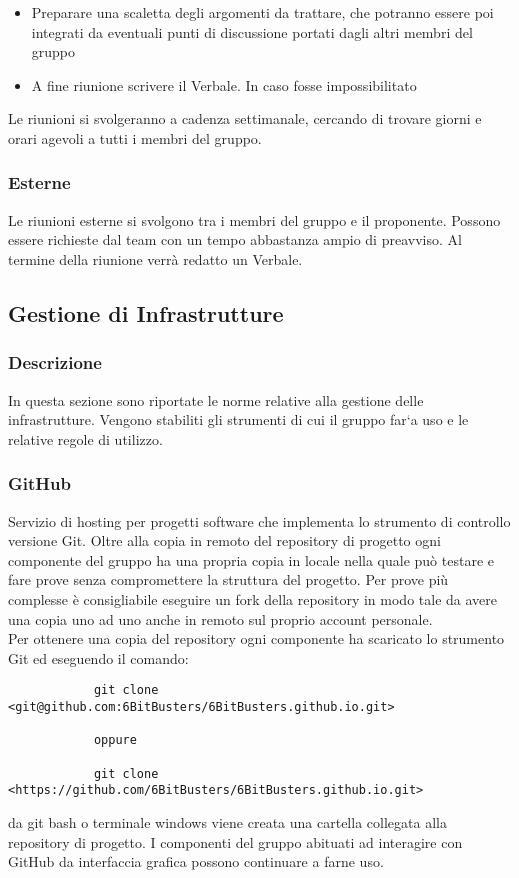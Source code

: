         \begin{itemize}
            \item Preparare una scaletta degli argomenti da trattare, che potranno essere poi integrati da eventuali
            punti di discussione portati dagli altri membri del gruppo
            \item A fine riunione scrivere il Verbale. In caso fosse impossibilitato
        \end{itemize}

        Le riunioni si svolgeranno a cadenza settimanale, cercando di trovare giorni e orari agevoli a tutti i
        membri del gruppo.
        \subsubsection{Esterne}
        Le riunioni esterne si svolgono tra i membri del gruppo e il proponente. Possono essere richieste
        dal team con un tempo abbastanza ampio di preavviso. Al termine della riunione verrà redatto un Verbale.


    \subsection{Gestione di Infrastrutture}
        \subsubsection{Descrizione}
        In questa sezione sono riportate le norme relative alla gestione delle infrastrutture. Vengono stabiliti gli
        strumenti di cui il gruppo far`a uso e le relative regole di utilizzo.
        \subsubsection{GitHub}
        Servizio di hosting per progetti software che implementa lo strumento di controllo versione Git. 
        Oltre alla copia in remoto del repository di progetto ogni componente del gruppo ha una propria
        copia in locale nella quale può testare e fare prove senza compromettere la struttura del progetto.
        Per prove più complesse è consigliabile eseguire un fork della repository in modo tale da avere una copia uno ad uno anche in 
        remoto sul proprio account personale.\\
        Per ottenere una copia del repository ogni componente ha scaricato lo strumento Git ed eseguendo il
        comando:
        \begin{verbatim}
            git clone <git@github.com:6BitBusters/6BitBusters.github.io.git>

            oppure
            
            git clone <https://github.com/6BitBusters/6BitBusters.github.io.git>
        \end{verbatim}
        da git bash o terminale windows viene creata una cartella collegata alla repository di progetto.
        I componenti del gruppo abituati ad interagire con GitHub da interfaccia grafica possono continuare a
        farne uso.
        
